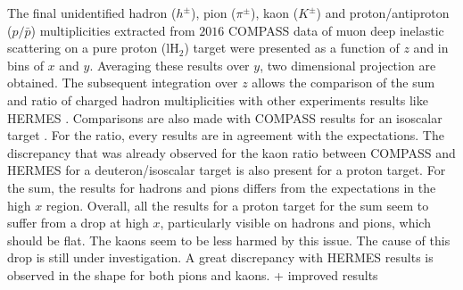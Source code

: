 The final unidentified hadron ($h^{\pm}$), pion ($\pi^{\pm}$), kaon ($K^{\pm}$) and proton/antiproton ($p/\bar{p}$) multiplicities extracted from $2016$ COMPASS data of muon deep inelastic scattering on a pure proton (lH$_2$) target were presented as a function of $z$ and in bins of $x$ and $y$. Averaging these results over $y$, two dimensional projection are obtained. The subsequent integration over $z$ allows the comparison of the sum and ratio of charged hadron multiplicities with other experiments results like HERMES \cite{HERMESMult}. Comparisons are also made with COMPASS results for an isoscalar target \cite{COMPASS2006Pi,COMPASS2006K}. For the ratio, every results are in agreement with the expectations. The discrepancy that was already observed for the kaon ratio between COMPASS and HERMES for a deuteron/isoscalar target is also present for a proton target. For the sum, the results for hadrons and pions differs from the expectations in the high $x$ region. Overall, all the results for a proton target for the sum seem to suffer from a drop at high $x$, particularly visible on hadrons and pions, which should be flat. The kaons seem to be less harmed by this issue. The cause of this drop is still under investigation. A great discrepancy with HERMES results is observed in the shape for both pions and kaons. + improved results
